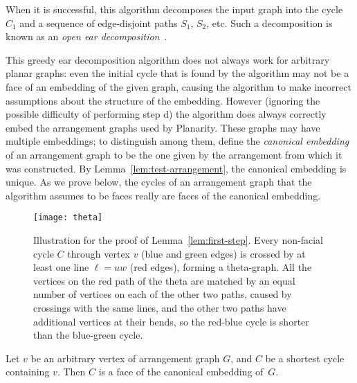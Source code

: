 \documentclass[oribibl]{llncs}
\begin{document}
When it is successful, this algorithm decomposes the input graph into the cycle $C_1$ and a sequence of edge-disjoint paths $S_1$, $S_2$, etc. Such a decomposition is known as an \emph{open ear decomposition}~\cite{Khu-SN-89}.

This greedy ear decomposition algorithm does not always work for arbitrary planar graphs: even the initial cycle that is found by the algorithm may not be a face of an embedding of the given graph, causing the algorithm to make incorrect assumptions about the structure of the embedding. 
However (ignoring the possible difficulty of performing step d) the algorithm does always correctly embed the arrangement graphs used by Planarity. These graphs may have multiple embeddings; to distinguish among them, define the \emph{canonical embedding} of an arrangement graph to be the one given by the arrangement from which it was constructed. By Lemma~\ref{lem:test-arrangement}, the canonical embedding is unique.
 As we prove below, the cycles of an arrangement graph that the algorithm assumes to be faces really are faces of the canonical embedding.

\begin{figure}[t]
\centering\texttt{[image: theta]}
\caption{Illustration for the proof of Lemma~\ref{lem:first-step}. Every non-facial cycle $C$ through vertex $v$ (blue and green edges) is crossed by at least one line $\ell=uw$ (red edges), forming a theta-graph. All the vertices on the red path of the theta are matched by an equal number of vertices on each of the other two paths, caused by crossings with the same lines, and the other two paths have additional vertices at their bends, so the red-blue cycle is shorter than the blue-green cycle.}
\label{fig:theta}
\end{figure}

\begin{lemma}
\label{lem:first-step}
Let $v$ be an arbitrary vertex of arrangement graph $G$, and $C$ be a shortest cycle containing $v$. Then $C$ is a face of the canonical embedding of~$G$.
\end{lemma}
\end{document}
